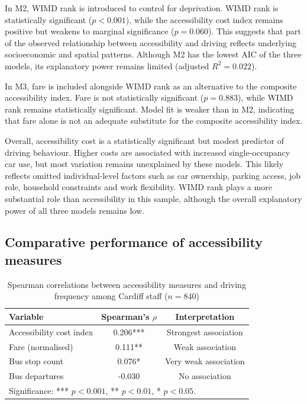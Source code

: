 \documentclass[11pt,a4paper]{article}
\begin{document}
In M2, WIMD rank is introduced to control for deprivation. WIMD rank is statistically significant (\(p < 0.001\)), while the accessibility cost index remains positive but weakens to marginal significance (\(p = 0.060\)). This suggests that part of the observed relationship between accessibility and driving reflects underlying socioeconomic and spatial patterns. Although M2 has the lowest AIC of the three models, its explanatory power remains limited (adjusted \(R^2 = 0.022\)).

In M3, fare is included alongside WIMD rank as an alternative to the composite accessibility index. Fare is not statistically significant (\(p = 0.883\)), while WIMD rank remains statistically significant. Model fit is weaker than in M2, indicating that fare alone is not an adequate substitute for the composite accessibility index.

Overall, accessibility cost is a statistically significant but modest predictor of driving behaviour. Higher costs are associated with increased single-occupancy car use, but most variation remains unexplained by these models. This likely reflects omitted individual-level factors such as car ownership, parking access, job role, household constraints and work flexibility. WIMD rank plays a more substantial role than accessibility in this sample, although the overall explanatory power of all three models remains low.


\subsection{Comparative performance of accessibility measures}

\begin{table}[H]
\centering
\caption{Spearman correlations between accessibility measures and driving frequency among Cardiff staff ($n = 840$)}
\label{tab:accessibility_measure_correlations}
\begin{tabular}{lcc}
\hline
Variable & Spearman's $\rho$ & Interpretation \\
\hline
Accessibility cost index & 0.206*** & Strongest association \\
Fare (normalised)        & 0.111**  & Weak association \\
Bus stop count           & 0.076*   & Very weak association \\
Bus departures           & -0.030   & No association \\
\hline
\multicolumn{3}{l}{\footnotesize Significance: *** $p<0.001$, ** $p<0.01$, * $p<0.05$.} \\
\end{tabular}
\end{table}
\end{document}
